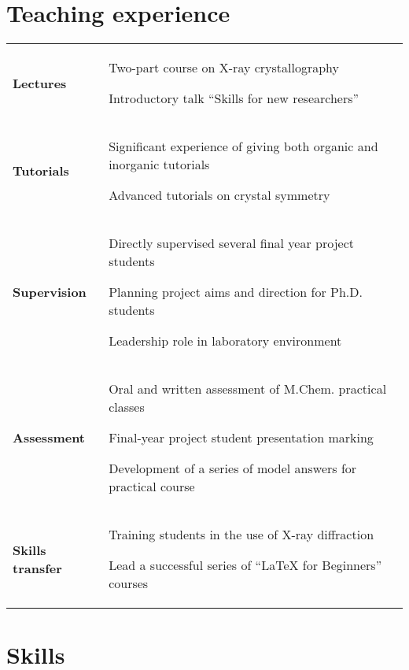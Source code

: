 \documentclass[11pt,draft]{article}
\makeatletter
\renewcommand*\LaTeX{LaTeX}
\newlength\sidewidth
\newlength\mainwidth
\newenvironment{CVtable}
  {%
    \begin{tabular}
      {@{}>{\bfseries}p{\sidewidth}@{}>{\RaggedRight}p{\mainwidth}@{}}%
  }
  {\end{tabular}}
\makeatother
\begin{document}
\section{Teaching experience}

\begin{CVtable}
  Lectures &
    Two-part course on X-ray crystallography \par
    Introductory talk \enquote{Skills for new researchers}
  \\
  
  Tutorials &
    Significant experience of giving both organic and inorganic
      tutorials \par
    Advanced tutorials on crystal symmetry  
  \\

  Supervision &
    Directly supervised several final year project students \par
    Planning project aims and direction for Ph.D. students \par
    Leadership role in laboratory environment 
  \\
  
  Assessment &
    Oral and written assessment of M.Chem. practical classes \par
    Final-year project student presentation marking \par
    Development of a series of model answers for practical course 
  \\
    
  Skills transfer &
    Training students in the use of X-ray diffraction \par
    Lead a successful series of \enquote{\LaTeX{} for Beginners} courses
  \\
    
\end{CVtable}

\section{Skills}
\end{document}
